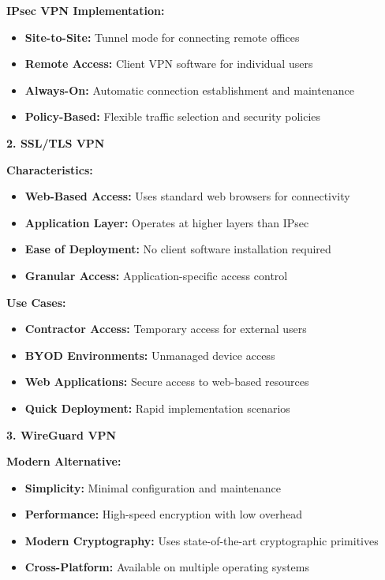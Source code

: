 \documentclass[12pt,a4paper]{article}
\begin{document}
\textbf{IPsec VPN Implementation:}
\begin{itemize}
    \item \textbf{Site-to-Site:} Tunnel mode for connecting remote offices
    \item \textbf{Remote Access:} Client VPN software for individual users
    \item \textbf{Always-On:} Automatic connection establishment and maintenance
    \item \textbf{Policy-Based:} Flexible traffic selection and security policies
\end{itemize}

\textbf{2. SSL/TLS VPN}

\textbf{Characteristics:}
\begin{itemize}
    \item \textbf{Web-Based Access:} Uses standard web browsers for connectivity
    \item \textbf{Application Layer:} Operates at higher layers than IPsec
    \item \textbf{Ease of Deployment:} No client software installation required
    \item \textbf{Granular Access:} Application-specific access control
\end{itemize}

\textbf{Use Cases:}
\begin{itemize}
    \item \textbf{Contractor Access:} Temporary access for external users
    \item \textbf{BYOD Environments:} Unmanaged device access
    \item \textbf{Web Applications:} Secure access to web-based resources
    \item \textbf{Quick Deployment:} Rapid implementation scenarios
\end{itemize}

\textbf{3. WireGuard VPN}

\textbf{Modern Alternative:}
\begin{itemize}
    \item \textbf{Simplicity:} Minimal configuration and maintenance
    \item \textbf{Performance:} High-speed encryption with low overhead
    \item \textbf{Modern Cryptography:} Uses state-of-the-art cryptographic primitives
    \item \textbf{Cross-Platform:} Available on multiple operating systems
\end{itemize}
\end{document}
